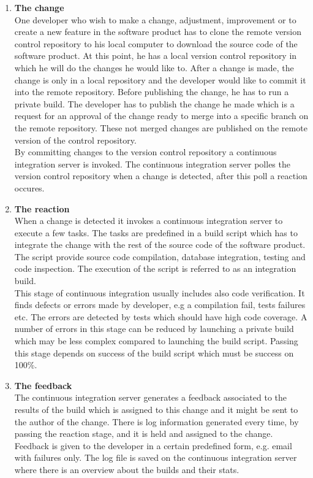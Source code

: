\begin{enumerate}

    \item \textbf{The change}\\[0.1em]
          One developer who wish to make a change, adjustment, improvement or to create a new feature in the software product has to clone the remote version control repository to his local computer to download the source code of the software product. At this point, he has a local version control repository in which he will do the changes he would like to. After a change is made, the change is only in a local repository and the developer would like to commit it into the remote repository. Before publishing the change, he has to run a private build. The developer has to publish the change he made which is a request for an approval of the change ready to merge into a specific branch on the remote repository. These not merged changes are published on the remote version of the control repository.\\[0.1em]
          By committing changes to the version control repository a continuous integration server is invoked. The continuous integration server polles the version control repository when a change is detected, after this poll a reaction occures.

    \item \textbf{The reaction}\\[0.1em]
          When a change is detected it invokes a continuous integration server to execute a few tasks. The tasks are predefined in a build script which has to integrate the change with the rest of the source code of the software product. The script provide source code compilation, database integration, testing and code inspection. The execution of the script is referred to as an integration build.\\[0.1em]
          This stage of continuous integration usually includes also code verification. It finds defects or errors made by developer, e.g a compilation fail, tests failures etc. The errors are detected by tests which should have high code coverage. A number of errors in this stage can be reduced by launching a private build which may be less complex compared to launching the build script. Passing this stage depends on success of the build script which must be success on 100\%.

    \item \textbf{The feedback}\\[0.1em]
          The continuous integration server generates a feedback associated to the results of the build which is assigned to this change and it might be sent to the author of the change. There is log information generated every time, by passing the reaction stage, and it is held and assigned to the change. Feedback is given to the developer in a certain predefined form, e.g. email with failures only. The log file is saved on the continuous integration server where there is an overview about the builds and their stats.


\end{enumerate}
